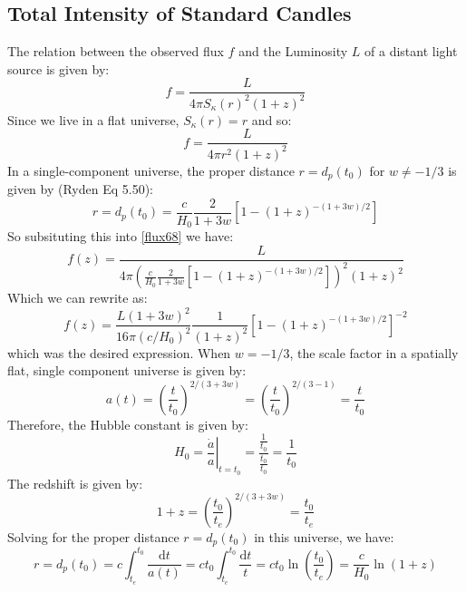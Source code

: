 \subsection{Total Intensity of Standard Candles}
The relation between the observed flux $f$ and the Luminosity $L$ of a distant light source is given by:
\begin{equation}
    f = \frac{L}{4\pi S_\kappa(r)^2(1+z)^2}
\end{equation}
Since we live in a flat universe, $S_\kappa(r) = r$ and so:
\begin{equation}\label{flux68}
    f = \frac{L}{4\pi r^2(1+z)^2}
\end{equation}
In a single-component universe, the proper distance $r = d_p(t_0)$ for $w \neq -1/3$ is given by (Ryden Eq 5.50):
\begin{equation}
    r = d_p(t_0) = \frac{c}{H_0}\frac{2}{1+3w}\left[1 - (1+z)^{-(1+3w)/2}\right]
\end{equation}
So subsituting this into \eqref{flux68} we have:
\begin{equation}
    f(z) = \frac{L}{4\pi \left(\frac{c}{H_0}\frac{2}{1+3w}\left[1 - (1+z)^{-(1+3w)/2}\right]\right)^2(1+z)^2}
\end{equation}
Which we can rewrite as:
\begin{equation}
    \boxed{f(z) = \frac{L(1+3w)^2}{16\pi(c/H_0)^2}\frac{1}{(1+z)^2}\left[1 - (1+z)^{-(1+3w)/2}\right]^{-2}}
\end{equation}
which was the desired expression. When $w = -1/3$, the scale factor in a spatially flat, single component universe is given by:
\begin{equation}
    a(t) = \left(\frac{t}{t_0}\right)^{2/(3+3w)} = \left(\frac{t}{t_0}\right)^{2/(3-1)} = \frac{t}{t_0}
\end{equation}
Therefore, the Hubble constant is given by:
\begin{equation}
    H_0 = \left.\frac{\dot{a}}{a}\right|_{t = t_0} = \frac{\frac{1}{t_0}}{\frac{t_0}{t_0}} = \frac{1}{t_0}
\end{equation}
The redshift is given by:
\begin{equation}
    1 + z = \left(\frac{t_0}{t_e}\right)^{2/(3+3w)} = \frac{t_0}{t_e}
\end{equation}
Solving for the proper distance $r = d_p(t_0)$ in this universe, we have:
\begin{equation}
    r = d_p(t_0) = c\int_{t_e}^{t_0}\frac{\mathrm d t}{a(t)} = ct_0\int_{t_e}^{t_0} \frac{\mathrm d t}{t} = ct_0\ln(\frac{t_0}{t_e}) = \frac{c}{H_0}\ln(1+z)
\end{equation}
